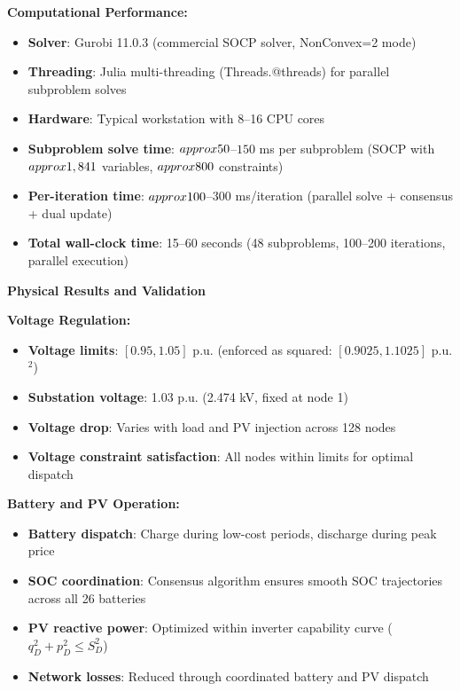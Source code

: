 \documentclass[11pt]{article}
\begin{document}
\textbf{Computational Performance:}
\begin{itemize}
    \item \textbf{Solver}: Gurobi 11.0.3 (commercial SOCP solver, NonConvex=2 mode)
    \item \textbf{Threading}: Julia multi-threading (Threads.@threads) for parallel subproblem solves
    \item \textbf{Hardware}: Typical workstation with 8--16 CPU cores
    \item \textbf{Subproblem solve time}: $\\approx 50$--$150$ ms per subproblem (SOCP with $\\approx 1,841$ variables, $\\approx 800$ constraints)
    \item \textbf{Per-iteration time}: $\\approx 100$--$300$ ms/iteration (parallel solve + consensus + dual update)
    \item \textbf{Total wall-clock time}: 15--60 seconds (48 subproblems, 100--200 iterations, parallel execution)
\end{itemize}

\textbf{Physical Results and Validation}

\textbf{Voltage Regulation:}
\begin{itemize}
    \item \textbf{Voltage limits}: $[0.95, 1.05]$ p.u. (enforced as squared: $[0.9025, 1.1025]$ p.u.$^2$)
    \item \textbf{Substation voltage}: 1.03 p.u. (2.474 kV, fixed at node 1)
    \item \textbf{Voltage drop}: Varies with load and PV injection across 128 nodes
    \item \textbf{Voltage constraint satisfaction}: All nodes within limits for optimal dispatch
\end{itemize}

\textbf{Battery and PV Operation:}
\begin{itemize}
    \item \textbf{Battery dispatch}: Charge during low-cost periods, discharge during peak price
    \item \textbf{SOC coordination}: Consensus algorithm ensures smooth SOC trajectories across all 26 batteries
    \item \textbf{PV reactive power}: Optimized within inverter capability curve ($q_D^2 + p_D^2 \leq S_D^2$)
    \item \textbf{Network losses}: Reduced through coordinated battery and PV dispatch
\end{itemize}
\end{document}
